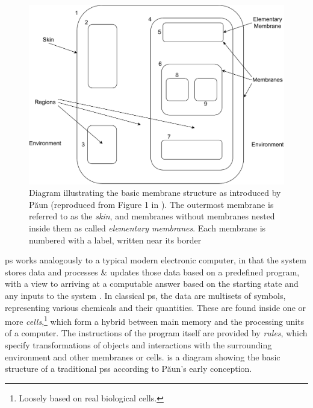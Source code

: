 \begin{figure}
    \centering
    \includegraphics[width=1.0\textwidth]{chapters/background/images/membranestructure.pdf}
    \caption[Diagram illustrating the basic membrane structure as introduced by Păun]{Diagram illustrating the basic membrane structure as introduced by Păun (reproduced from Figure 1 in \cite{Paun2006}).  The outermost membrane is referred to as the \emph{skin}, and membranes without membranes nested inside them as called \emph{elementary membranes}.  Each membrane is numbered with a label, written near its border}
    \label{fig:back:membranestructure}
\end{figure}

\Gls{ps} works analogously to a typical modern electronic computer, in that the system stores data and processes \& updates those data based on a predefined program, with a view to arriving at a computable answer based on the starting state and any inputs to the system \cite{Paun2002,Paun2010b}.  In classical \gls{ps}, the data are multisets of symbols, representing various chemicals and their quantities.  These are found inside one or more \emph{cells},\footnote{Loosely based on real biological cells.} which form a hybrid between main memory and the processing units of a computer.  The instructions of the program itself are provided by \emph{rules}, which specify transformations of objects and interactions with the surrounding environment and other membranes or cells.   is a diagram showing the basic structure of a traditional \glspl{ps} according to Păun's early conception.

